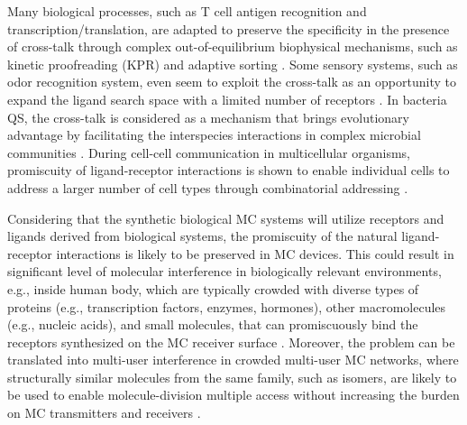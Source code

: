 \documentclass[twocolumn]{IEEEtran}
\begin{document}
%


Many biological processes, such as T cell antigen recognition and transcription/translation, are adapted to preserve the specificity in the presence of cross-talk through complex out-of-equilibrium biophysical mechanisms, such as kinetic proofreading (KPR) and adaptive sorting \cite{yousefi2019optogenetic, lalanne2013principles}. Some sensory systems, such as odor recognition system, even seem to exploit the cross-talk as an opportunity to expand the ligand search space with a limited number of receptors \cite{hallem2006coding, carballo2019receptor}. In bacteria QS, the cross-talk is considered as a mechanism that brings evolutionary advantage by facilitating the interspecies interactions in complex microbial communities \cite{wellington2019quorum}. During cell-cell communication in multicellular organisms, promiscuity of ligand-receptor interactions is shown to enable individual cells to address a larger number of cell types through combinatorial addressing \cite{su2020ligand}.   


Considering that the synthetic biological MC systems will utilize receptors and ligands derived from biological systems, the promiscuity of the natural ligand-receptor interactions is likely to be preserved in MC devices. This could result in significant level of molecular interference in biologically relevant environments, e.g., inside human body, which are typically crowded with diverse types of proteins (e.g., transcription factors, enzymes, hormones), other macromolecules (e.g., nucleic acids), and small molecules, that can promiscuously bind the receptors synthesized on the MC receiver surface \cite{uhlen2015tissue, thul2017subcellular, luck2020reference}. Moreover, the problem can be translated into multi-user interference in crowded multi-user MC networks, where structurally similar molecules from the same family, such as isomers, are likely to be used to enable molecule-division multiple access without increasing the burden on MC transmitters and receivers \cite{dinc2017theoretical, kim2013novel}. 
\end{document}
